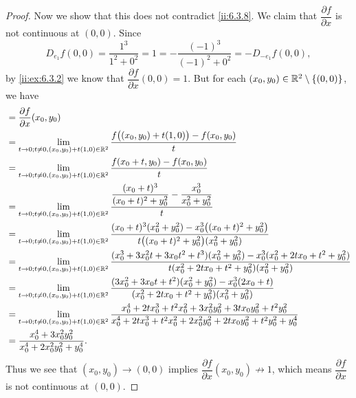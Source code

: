\begin{proof}
  Now we show that this does not contradict \cref{ii:6.3.8}.
  We claim that \(\dfrac{\partial f}{\partial x}\) is not continuous at \((0, 0)\).
  Since
  \[
    D_{e_1} f(0, 0) = \dfrac{1^3}{1^2 + 0^2} = 1 = -\dfrac{(-1)^3}{(-1)^2 + 0^2} = -D_{-e_1} f(0, 0),
  \]
  by \cref{ii:ex:6.3.2} we know that \(\dfrac{\partial f}{\partial x}(0, 0) = 1\).
  But for each \((x_0, y_0) \in \mathbb{R}^2 \setminus \left\lbrace(0, 0)\right\rbrace\), we have
  \begin{align*}
     & = \dfrac{\partial f}{\partial x}(x_0, y_0)                                                                                                                                                                                      \\
     & = \lim_{t \to 0 ; t \neq 0, (x_0, y_0) + t(1, 0) \in \mathbb{R}^2} \dfrac{f\big((x_0, y_0) + t(1, 0)\big) - f(x_0, y_0)}{t}                                                                                                             \\
     & = \lim_{t \to 0 ; t \neq 0, (x_0, y_0) + t(1, 0) \in \mathbb{R}^2} \dfrac{f(x_0 + t, y_0) - f(x_0, y_0)}{t}                                                                                                                             \\
     & = \lim_{t \to 0 ; t \neq 0, (x_0, y_0) + t(1, 0) \in \mathbb{R}^2} \dfrac{\dfrac{(x_0 + t)^3}{(x_0 + t)^2 + y_0^2} - \dfrac{x_0^3}{x_0^2 + y_0^2}}{t}                                                                                   \\
     & = \lim_{t \to 0 ; t \neq 0, (x_0, y_0) + t(1, 0) \in \mathbb{R}^2} \dfrac{(x_0 + t)^3 (x_0^2 + y_0^2) - x_0^3 \big((x_0 + t)^2 + y_0^2\big)}{t \big((x_0 + t)^2 + y_0^2\big) (x_0^2 + y_0^2)}                                           \\
     & = \lim_{t \to 0 ; t \neq 0, (x_0, y_0) + t(1, 0) \in \mathbb{R}^2} \dfrac{(x_0^3 + 3 x_0^2 t + 3 x_0 t^2 + t^3) (x_0^2 + y_0^2) - x_0^3 (x_0^2 + 2 t x_0 + t^2 + y_0^2)}{t (x_0^2 + 2 t x_0 + t^2 + y_0^2) (x_0^2 + y_0^2)}             \\
     & = \lim_{t \to 0 ; t \neq 0, (x_0, y_0) + t(1, 0) \in \mathbb{R}^2} \dfrac{(3 x_0^2 + 3 x_0 t + t^2) (x_0^2 + y_0^2) - x_0^3 (2 x_0 + t)}{(x_0^2 + 2 t x_0 + t^2 + y_0^2) (x_0^2 + y_0^2)}                                               \\
     & = \lim_{t \to 0 ; t \neq 0, (x_0, y_0) + t(1, 0) \in \mathbb{R}^2} \dfrac{x_0^4 + 2 t x_0^3 + t^2 x_0^2 + 3 x_0^2 y_0^2 + 3 t x_0 y_0^2 + t^2 y_0^2}{x_0^4 + 2 t x_0^3 + t^2 x_0^2 + 2 x_0^2 y_0^2 + 2 t x_0 y_0^2 + t^2 y_0^2 + y_0^4} \\
     & = \dfrac{x_0^4 + 3 x_0^2 y_0^2}{x_0^4 + 2 x_0^2 y_0^2 + y_0^4}.
  \end{align*}
  Thus we see that \((x_0, y_0) \to (0, 0)\) implies \(\dfrac{\partial f}{\partial x}(x_0, y_0) \not\to 1\), which means \(\dfrac{\partial f}{\partial x}\) is not continuous at \((0, 0)\).
\end{proof}

